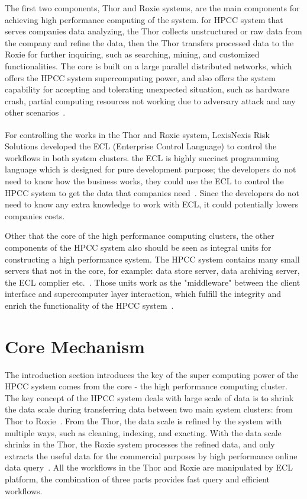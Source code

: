 The first two components, Thor and Roxie systems, are the main components for achieving high performance computing of the system. for HPCC system that serves companies data analyzing, the Thor collects unstructured or raw data from the company and refine the data, then the Thor transfers processed data to the Roxie for further inquiring, such as searching, mining, and customized functionalities. The core is built on a large parallel distributed networks, which offers the HPCC system supercomputing power, and also offers the system capability for accepting and tolerating unexpected situation, such as hardware crash, partial computing resources not working due to adversary attack and any other scenarios~\cite{Intro4}.

For controlling the works in the Thor and Roxie system, LexisNexis\textsuperscript{\textregistered} Risk Solutions developed the ECL (Enterprise Control Language) to control the workflows in both system clusters. the ECL is highly succinct programming language which is designed for pure development purpose; the developers do not need to know how the business works, they could use the ECL to control the HPCC system to get the data that companies need~\cite{ECL}. Since the developers do not need to know any extra knowledge to work with ECL, it could potentially lowers companies costs.

Other that the core of the high performance computing clusters, the other components of the HPCC system also should be seen as integral units for constructing a high performance system. The HPCC system contains many small servers that not in the core, for example: data store server, data archiving server, the ECL complier etc.~\cite{Intro4}. Those units work as the "middleware" between the client interface and supercomputer layer interaction, which fulfill the integrity and enrich the functionality of the HPCC system~\cite{Intro5}. 

\section{Core Mechanism}
The introduction section introduces the key of the super computing power of the HPCC system comes from the core - the high performance computing cluster. The key concept of the HPCC system deals with large scale of data is to shrink the data scale during transferring data between two main system clusters: from Thor to Roxie~\cite{CM1}. From the Thor, the data scale is refined by the system with multiple ways, such as cleaning, indexing, and exacting. With the data scale shrinks in the Thor, the Roxie system processes the refined data, and only extracts the useful data for the commercial purposes by high performance online data query~\cite{Intro3}. All the workflows in the Thor and Roxie are manipulated by ECL platform, the combination of three parts provides fast query and efficient workflows.

